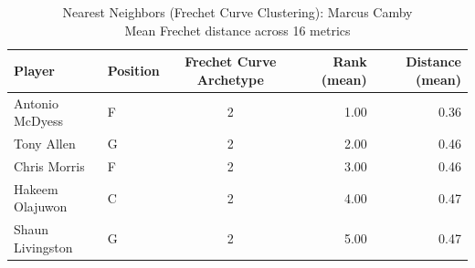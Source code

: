 \begin{table}[t]
\caption*{
{\fontsize{20}{25} Nearest Neighbors (Frechet Curve Clustering): Marcus Camby\fontsize{12}{15}\selectfont } \\ 
{\fontsize{14}{17}\selectfont  Mean Frechet distance across 16 metrics\fontsize{12}{15}\selectfont }
} 
\fontsize{12.0pt}{14.0pt}\selectfont
\begin{tabular*}{\linewidth}{@{\extracolsep{\fill}}llcrr}
\toprule
Player & Position & Frechet Curve Archetype & Rank (mean) & Distance (mean) \\ 
\midrule\addlinespace[2.5pt]
Antonio McDyess & F & 2 & 1.00 & 0.36 \\ 
Tony Allen & G & 2 & 2.00 & 0.46 \\ 
Chris Morris & F & 2 & 3.00 & 0.46 \\ 
Hakeem Olajuwon & C & 2 & 4.00 & 0.47 \\ 
Shaun Livingston & G & 2 & 5.00 & 0.47 \\ 
\bottomrule
\end{tabular*}
\end{table}

